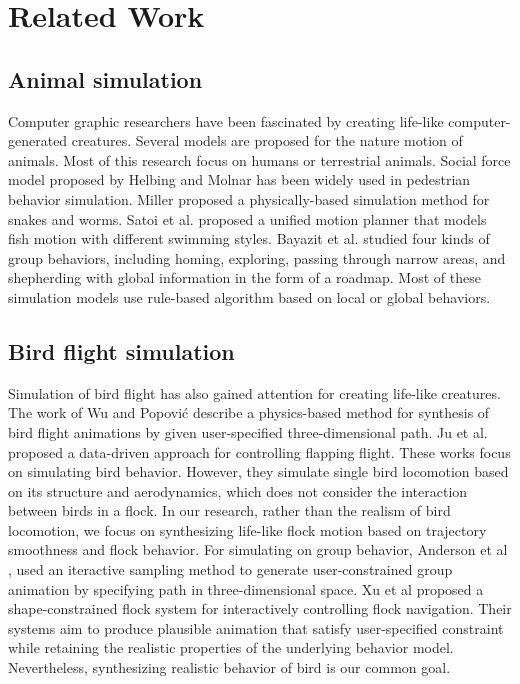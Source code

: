 \chapter{Related Work}

\section{Animal simulation}

Computer graphic researchers have been fascinated by creating life-like computer-generated creatures. Several models are proposed for the nature motion of animals. Most of this research focus on humans or terrestrial animals. Social force model proposed by Helbing and Molnar \cite{Social} has been widely used in pedestrian behavior simulation. Miller \cite{Snake} proposed a physically-based simulation method for snakes and worms. Satoi et al. proposed a unified motion planner \cite{Fish} that models fish motion with different swimming styles. Bayazit et al. \cite{OB1,OB2} studied four kinds of group behaviors, including homing, exploring, passing through narrow areas, and shepherding with global information in the form of a roadmap. Most of these simulation models use rule-based algorithm based on local or global behaviors.

\section{Bird flight simulation}

Simulation of bird flight has also gained attention for creating life-like creatures. The work of Wu and Popović \cite{Flight} describe a physics-based method for synthesis of bird flight animations by given user-specified three-dimensional path. Ju et al. \cite{Flappy} proposed a data-driven approach for controlling flapping flight. These works focus on simulating bird behavior. However, they simulate single bird locomotion based on its structure and aerodynamics, which does not consider the interaction between birds in a flock. In our research, rather than the realism of bird locomotion, we focus on synthesizing life-like flock motion based on trajectory smoothness and flock behavior. For simulating on group behavior, Anderson et al \cite{Constrained}, used an iteractive sampling method to generate user-constrained group animation by specifying path in three-dimensional space. Xu et al \cite{Shape} proposed a shape-constrained flock system for interactively controlling flock navigation. Their systems aim to produce plausible animation that satisfy user-specified constraint while retaining the realistic properties of the underlying behavior model. Nevertheless, synthesizing realistic behavior of bird is our common goal. 

